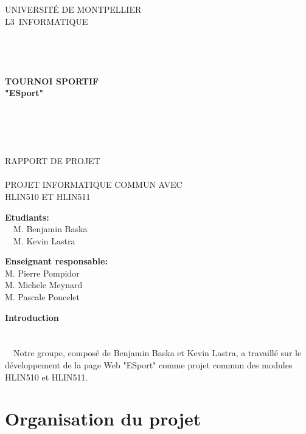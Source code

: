 \documentclass{article}
\begin{document}
\begin{center}
\linespread{2.0}\selectfont

{\Huge U}{\huge NIVERSITÉ DE }{\Huge M}{\huge ONTPELLIER}\\
{\huge L3}{\LARGE ~INFORMATIQUE }
\\~\\~\\~\\~\\
{\Large\textbf{TOURNOI SPORTIF\\"ESport"}}
\\~\\~\\~\\~\\

\linespread{1}\selectfont

RAPPORT DE PROJET\\~\\
PROJET INFORMATIQUE COMMUN AVEC\\
 HLIN510 ET HLIN511\\
\vfill
\end{center}
\begin{multicols}{2}
\begin{flushleft}
\textbf{Etudiants:}\\
~~M. Benjamin Baska\\
~~M. Kevin Lastra
\end{flushleft}
\columnbreak
\begin{flushright}
\textbf{Enseignant responsable:}\\
M. Pierre Pompidor~~~\\
M. Michele Meynard~~\\
M. Pascale Poncelet~~~
\end{flushright}
\end{multicols}
\newpage
\tableofcontents
\newpage
{\textbf{\Huge Introduction}}\\~\\~\\
~~Notre groupe, composé de Benjamin Baska et Kevin Lastra, a travaillé sur le développement de la page Web "ESport" comme projet commun des modules HLIN510 et HLIN511.
\newpage
\section{Organisation du projet}
\end{document}
